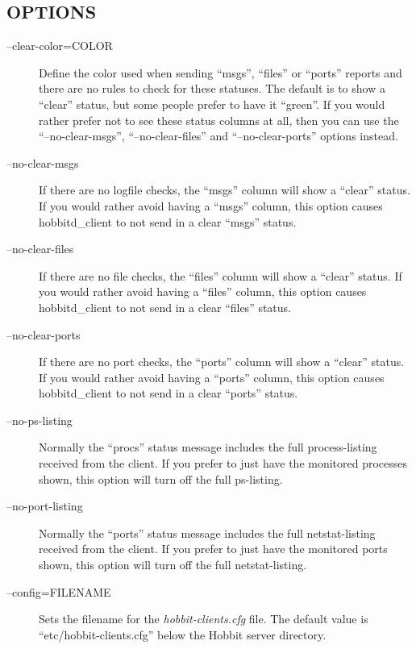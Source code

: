 \subsection{OPTIONS}
\begin{description}
\item[--clear-color=COLOR] Define the color used when sending ``msgs'', ``files'' or ``ports'' reports and there are no rules to check for these statuses. The default is to show a ``clear'' status, but some people prefer to have it ``green''. If you would rather prefer not to see these status columns at all, then you can use the ``--no-clear-msgs'', ``--no-clear-files'' and ``--no-clear-ports'' options instead. 

 

\item[--no-clear-msgs] If there are no logfile checks, the ``msgs'' column will show a ``clear'' status. If you would rather avoid having a ``msgs'' column, this option causes hobbitd\_client to not send in a clear ``msgs'' status. 

 

\item[--no-clear-files] If there are no file checks, the ``files'' column will show a ``clear'' status. If you would rather avoid having a ``files'' column, this option causes hobbitd\_client to not send in a clear ``files'' status. 

 

\item[--no-clear-ports] If there are no port checks, the ``ports'' column will show a ``clear'' status. If you would rather avoid having a ``ports'' column, this option causes hobbitd\_client to not send in a clear ``ports'' status. 

 

\item[--no-ps-listing] Normally the ``procs'' status message includes the full process-listing received from the client. If you prefer to just have the monitored processes shown, this option will turn off the full ps-listing. 

 

\item[--no-port-listing] Normally the ``ports'' status message includes the full netstat-listing received from the client. If you prefer to just have the monitored ports shown, this option will turn off the full netstat-listing. 

 

\item[--config=FILENAME] Sets the filename for the \emph{hobbit-clients.cfg}
 file. The default value is ``etc/hobbit-clients.cfg'' below the Hobbit server directory. 


\end{description}

